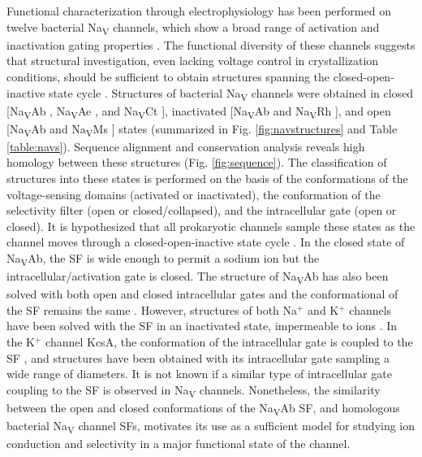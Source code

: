 \begin{refsection}
Functional characterization through electrophysiology has been performed on twelve bacterial Na\textsubscript{V} channels, which show a broad range of activation and inactivation gating properties \cite{T:2014eg,Payandeh:2015hz}. The functional diversity of these channels suggests that structural investigation, even lacking voltage control in crystallization conditions, should be sufficient to obtain structures spanning the closed-open-inactive state cycle \cite{Amaral:2012tn,Bagneris:2014eh,Sula:2017jx}. Structures of bacterial Na\textsubscript{V} channels were obtained in closed [Na\textsubscript{V}Ab \cite{Payandeh:2012ib}, Na\textsubscript{V}Ae \cite{Shaya:2014gg,Arrigoni:2016fs}, and Na\textsubscript{V}Ct \cite{Tsai:2013ie}], inactivated [Na\textsubscript{V}Ab \cite{Payandeh:2013ex} and Na\textsubscript{V}Rh \cite{Zhang:2013bz}], and open [Na\textsubscript{V}Ab \cite{Lenaeus:2017cy} and Na\textsubscript{V}Ms \cite{McCusker:2012di,Bagneris:2014ks,Naylor:2016cu,Sula:2017hu}] states (summarized in Fig. \ref{fig:navstructures} and Table \ref{table:navs}). Sequence alignment and conservation analysis reveals high homology between these structures (Fig. \ref{fig:sequence}). The classification of structures into these states is performed on the basis of the conformations of the voltage-sensing domains (activated or inactivated), the conformation of the selectivity filter (open or closed/collapsed), and the intracellular gate (open or closed). It is hypothesized that all prokaryotic channels sample these states as the channel moves through a closed-open-inactive state cycle \cite{Amaral:2012tn,Bagneris:2014eh,Sula:2017jx}. In the closed state of Na\textsubscript{V}Ab, the SF is wide enough to permit a sodium ion but the intracellular/activation gate is closed. The structure of Na\textsubscript{V}Ab has also been solved with both open and closed intracellular gates and the conformational of the SF remains the same \cite{Lenaeus:2017cy}. However, structures of both Na$^+$ and K$^+$ channels have been solved with the SF in an inactivated state, impermeable to ions \cite{Zhou:2001vo,Zhang:2013bz,Payandeh:2013ex}. In the K$^+$ channel KcsA, the conformation of the intracellular gate is coupled to the SF \cite{Cuello:2010gi,Kratochvil:2017ge,Cuello:2010kf}, and structures have been obtained with its intracellular gate sampling a wide range of diameters. It is not known if a similar type of intracellular gate coupling to the SF is observed in Na\textsubscript{V} channels. Nonetheless, the similarity between the open and closed conformations of the Na\textsubscript{V}Ab SF, and homologous bacterial Na\textsubscript{V} channel SFs, motivates its use as a sufficient model for studying ion conduction and selectivity in a major functional state of the channel. 


\end{refsection}

